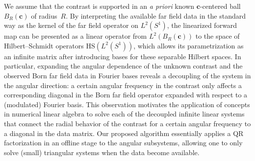 \documentclass[11pt,a4paper]{article}
\theoremstyle{definition}
\theoremstyle{remark} \newtheorem{remark}[theorem]{Remark}
\numberwithin{equation}{section}
\numberwithin{figure}{section}
\numberwithin{algorithm}{section}
\numberwithin{table}{section}
\newcommand{\bs}{\boldsymbol}
\newcommand{\bfc}{{\bs c}}
\newcommand{\HS}{\mathrm{HS}}
\newcommand{\Sone}{{S^1}}
\newcommand{\Ltwo}{{L^2}}
\begin{document}
We assume that the contrast is supported in an {\em a priori} known $\bfc$-centered ball $B_R(\bfc)$ of radius~$R$.
By interpreting the available far field data in the standard way as the kernel of the far field operator on $\Ltwo(\Sone)$, 
the linearized forward map can be presented as a linear operator from
$\Ltwo(B_R(\bfc))$ to the space of Hilbert--Schmidt operators $\HS(\Ltwo(\Sone))$, which allows its parametrization as an infinite matrix after introducing bases for these separable Hilbert spaces.
In particular, expanding the angular dependence of the unknown contrast and the observed Born far field data in Fourier bases reveals a decoupling of the system in the angular direction: a certain angular frequency in the contrast only affects a corresponding diagonal in the Born far field operator expanded  with respect to a (modulated) Fourier basis.
This observation motivates the application of concepts in numerical linear algebra to solve each of the decoupled infinite linear systems that connect the radial behavior of the contrast for a certain angular frequency to a diagonal in the data matrix. Our proposed algorithm essentially applies a QR factorization in an offline stage to the angular subsystems, allowing one to only solve (small) triangular systems when the data become available.

\end{document}
